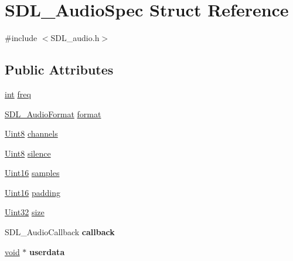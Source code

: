 \hypertarget{struct_s_d_l___audio_spec}{}\section{S\+D\+L\+\_\+\+Audio\+Spec Struct Reference}
\label{struct_s_d_l___audio_spec}


{\ttfamily \#include $<$S\+D\+L\+\_\+audio.\+h$>$}

\subsection*{Public Attributes}
\begin{DoxyCompactItemize}
\item 
\hyperlink{_s_d_l__thread_8h_a6a64f9be4433e4de6e2f2f548cf3c08e}{int} \hyperlink{struct_s_d_l___audio_spec_a8b823ce46fc2e448cf7e6fc141aff6b2}{freq}
\item 
\hyperlink{_s_d_l__audio_8h_a491ed103fd25d920c4e6b7495217ce66}{S\+D\+L\+\_\+\+Audio\+Format} \hyperlink{struct_s_d_l___audio_spec_ae37c634cac5807762f184c8d5d49fc2d}{format}
\item 
\hyperlink{_s_d_l__stdinc_8h_a2944638813a090aa23e62f4da842c3e2}{Uint8} \hyperlink{struct_s_d_l___audio_spec_a31fe8b3710cf23bbef24be8a1749fe46}{channels}
\item 
\hyperlink{_s_d_l__stdinc_8h_a2944638813a090aa23e62f4da842c3e2}{Uint8} \hyperlink{struct_s_d_l___audio_spec_addc462c8a806e6c122eccf63482048f6}{silence}
\item 
\hyperlink{_s_d_l__stdinc_8h_a31fcc0a076c9068668173ee26d33e42b}{Uint16} \hyperlink{struct_s_d_l___audio_spec_a2cdf5e885808c10bfa2810b706e69f95}{samples}
\item 
\hyperlink{_s_d_l__stdinc_8h_a31fcc0a076c9068668173ee26d33e42b}{Uint16} \hyperlink{struct_s_d_l___audio_spec_a738371fc13b54cefef4db16994abeeb6}{padding}
\item 
\hyperlink{_s_d_l__stdinc_8h_add440eff171ea5f55cb00c4a9ab8672d}{Uint32} \hyperlink{struct_s_d_l___audio_spec_a154cf44743ecec78c36dc6c827dd2fdb}{size}
\item 
\hypertarget{struct_s_d_l___audio_spec_a1f8d05139f1679dcf359f49251233eac}{}S\+D\+L\+\_\+\+Audio\+Callback {\bfseries callback}\label{struct_s_d_l___audio_spec_a1f8d05139f1679dcf359f49251233eac}

\item 
\hypertarget{struct_s_d_l___audio_spec_aeec9481666f5f0982c98d3878f175d9b}{}\hyperlink{_s_d_l__audio_8h_a52835ae37c4bb905b903cbaf5d04b05f}{void} $\ast$ {\bfseries userdata}\label{struct_s_d_l___audio_spec_aeec9481666f5f0982c98d3878f175d9b}

\end{DoxyCompactItemize}


